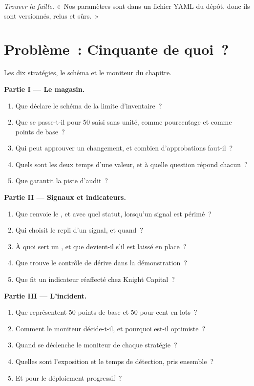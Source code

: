 \begin{exercise}[$\star\star\star$]\label{exo:pl:signal-serving-and-parameter-management:8}
\emph{Trouver la faille.} «~Nos paramètres sont dans un fichier YAML du dépôt, donc ils sont versionnés, relus et sûrs.~»
\end{exercise}

\section{Problème~: Cinquante de quoi~?}

\begin{problem}\label{pb:pl:signal-serving-and-parameter-management:1}
Les dix stratégies, le schéma et le moniteur du chapitre.

\medskip\noindent\textbf{Partie I --- Le magasin.}
\begin{enumerate}
\item Que déclare le schéma de la limite d'inventaire~?
\item Que se passe-t-il pour 50 saisi sans unité, comme pourcentage et comme points de base~?
\item Qui peut approuver un changement, et combien d'approbations faut-il~?
\item Quels sont les deux temps d'une valeur, et à quelle question répond chacun~?
\item Que garantit la piste d'audit~?
\end{enumerate}

\medskip\noindent\textbf{Partie II --- Signaux et indicateurs.}
\begin{enumerate}[resume]
\item Que renvoie le , et avec quel statut, lorsqu'un signal est périmé~?
\item Qui choisit le repli d'un signal, et quand~?
\item À quoi sert un , et que devient-il s'il est laissé en place~?
\item Que trouve le contrôle de dérive dans la démonstration~?
\item Que fit un indicateur réaffecté chez Knight Capital~?
\end{enumerate}

\medskip\noindent\textbf{Partie III --- L'incident.}
\begin{enumerate}[resume]
\item Que représentent 50 points de base et 50 pour cent en lots~?
\item Comment le moniteur décide-t-il, et pourquoi est-il optimiste~?
\item Quand se déclenche le moniteur de chaque stratégie~?
\item Quelles sont l'exposition et le temps de détection, pris ensemble~?
\item Et pour le déploiement progressif~?
\end{enumerate}


\end{problem}
